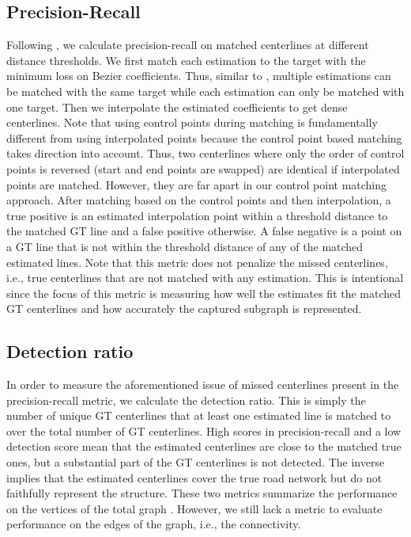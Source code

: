 \documentclass[10pt,twocolumn,letterpaper]{article}
\begin{document}
\subsection{Precision-Recall}
Following \cite{DBLP:journals/corr/abs-2012-12160, DBLP:conf/cvpr/HomayounfarMLU18}, we calculate precision-recall on matched centerlines at different distance thresholds. We first match each estimation to the target with the minimum  loss on Bezier coefficients. Thus, similar to \cite{DBLP:journals/corr/abs-2012-12160}, multiple estimations can be matched with the same target while each estimation can only be matched with one target. Then we interpolate the estimated coefficients to get dense centerlines. Note that using control points during matching is fundamentally different from using interpolated points because the control point based matching takes direction into account. Thus, two centerlines where only the order of control points is reversed (start and end points are swapped) are identical if interpolated points are matched. However, they are far apart in our control point matching approach. After matching based on the control points and then interpolation, a true positive is an estimated interpolation point within a threshold distance to the matched GT line and a false positive otherwise. A false negative is a point on a GT line that is not within the threshold distance of any of the matched estimated lines. Note that this metric does not penalize the missed centerlines, i.e., true centerlines that are not matched with any estimation. This is intentional since the focus of this metric is measuring how well the estimates fit the matched GT centerlines and how accurately the captured subgraph is represented.   

\subsection{Detection ratio}

In order to measure the aforementioned issue of missed centerlines present in the precision-recall metric, we calculate the detection ratio. This is simply the number of unique GT centerlines that at least one estimated line is matched to over the total number of GT centerlines. High scores in precision-recall and a low detection score mean that the estimated centerlines are close to the matched true ones, but a substantial part of the GT centerlines is not detected. The inverse implies that the estimated centerlines cover the true road network but do not faithfully represent the structure. These two metrics summarize the performance on the vertices of the total graph . However, we still lack a metric to evaluate performance on the edges of the graph, i.e., the connectivity.
\end{document}
